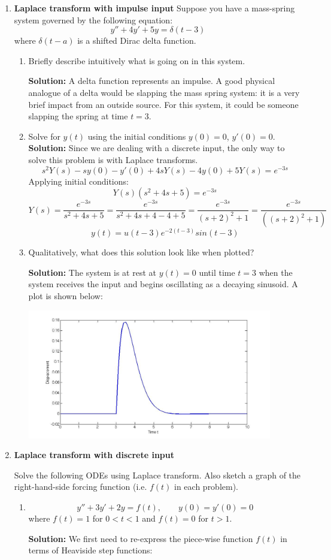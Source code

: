 \documentclass[letterpaper, fontsize=11pt]{scrartcl} %
\numberwithin{equation}{section} %
\numberwithin{figure}{section} %
\numberwithin{table}{section} %
\begin{document}
\begin{enumerate}
\item \textbf{Laplace transform with impulse input} Suppose you have a mass-spring system governed by the following equation:
$$y'' + 4y' + 5y = \delta(t-3)$$ where $\delta(t-a)$ is a shifted Dirac delta function. 
\begin{enumerate}
\item Briefly describe intuitively what is going on in this system. \par
\textbf{Solution:} A delta function represents an impulse. A good physical analogue of a delta would be slapping the mass spring system: it is a very brief impact from an outside source. For this system, it could be someone slapping the spring at time $t = 3$. 
\item Solve for $y(t)$ using the initial conditions $y(0) = 0$, $y'(0) = 0$. \newline
\textbf{Solution:} Since we are dealing with a discrete input, the only way to solve this problem is with Laplace transforms.
$$s^2Y(s) - sy(0) - y'(0) + 4sY(s) - 4y(0) + 5Y(s) = e^{-3s}$$
Applying initial conditions:
$$Y(s)(s^2 + 4s + 5) = e^{-3s}$$
$$Y(s) = \frac{e^{-3s}}{s^2 + 4s + 5} = \frac{e^{-3s}}{s^2 + 4s + 4 - 4 + 5} = \frac{e^{-3s}}{(s+2)^2 + 1} = \frac{e^{-3s}}{((s+2)^2 + 1)}$$
$$y(t) = u(t-3)e^{-2(t-3)}sin(t-3)$$
\item Qualitatively, what does this solution look like when plotted? \par
\textbf{Solution:} The system is at rest at $y(t) = 0$ until time $t = 3$ when the system receives the input and begins oscillating as a decaying sinusoid. A plot is shown below:
\begin{center} \includegraphics[width = 4.2in]{section9_2.jpg} \end{center}
\end{enumerate}

\item \textbf{Laplace transform with discrete input} 
\par Solve the following ODEs using Laplace transform. Also sketch a graph of the right-hand-side forcing function (i.e. $f(t)$ in each problem). 
\begin{enumerate}
\item 
$$y'' + 3y' + 2y = f(t),\qquad y(0) = y'(0) = 0$$  
where $f(t) = 1$ for $0 < t < 1$ and $f(t) = 0$ for $t > 1$. 
\par \textbf{Solution:}\newline
We first need to re-express the piece-wise function $f(t)$ in terms of Heaviside step functions:


\end{enumerate}
\end{enumerate}
\end{document}
